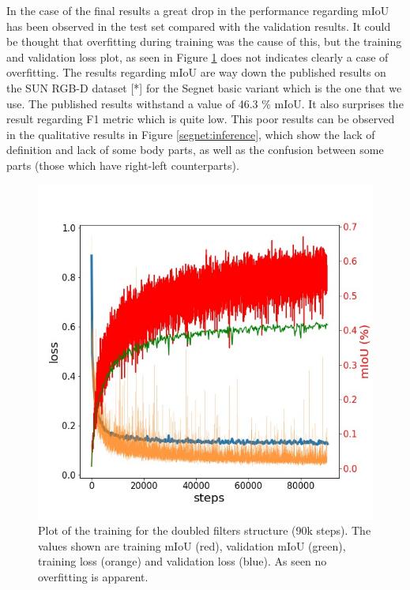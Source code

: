 \documentclass[12pt,a4paper]{article}
\begin{document}
In the case of the final results a great drop in the performance regarding mIoU has been observed in the test set compared with the validation results. It could be thought that overfitting during training was the cause of this, but the training and validation loss plot, as seen in Figure \ref{segnet:over} does not indicates clearly a case of overfitting. The results regarding mIoU are way down the published results on the SUN RGB-D dataset [*] for the Segnet basic variant which is the one that we use. The published results withstand a value of 46.3 $\%$ mIoU. It also surprises the result regarding F1 metric which is quite low. This poor results can be observed in the qualitative results in Figure \ref{segnet:inference}, which show the lack of definition and lack of some body parts, as well as the confusion between some parts (those which have right-left counterparts).\newline

\begin{figure}
\centering
\includegraphics[scale=0.4]{seg_res_3.jpg}
\caption{Plot of the training for the doubled filters structure (90k steps). The values shown are training mIoU (red), validation mIoU (green), training loss (orange) and validation loss (blue). As seen no overfitting is apparent.}
\label{segnet:over}
\end{figure}
\end{document}
